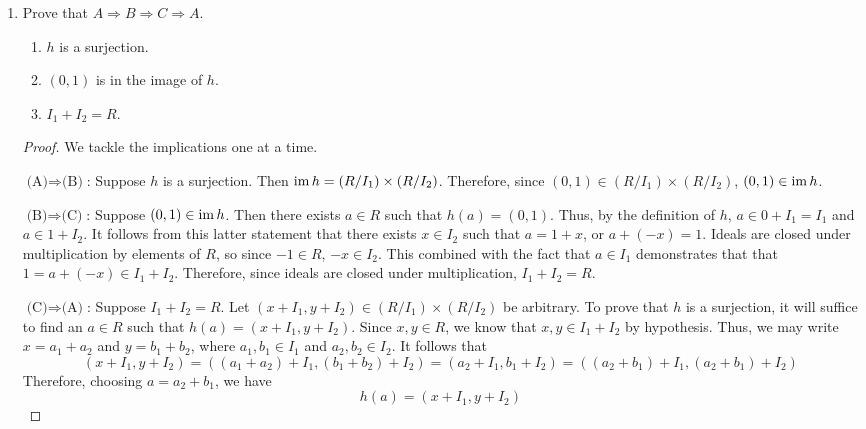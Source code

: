 \documentclass[../psets.tex]{subfiles}
\begin{document}
\begin{enumerate}
\begin{enumerate}[label={(\roman*)}]
\begin{proof}
            \begin{equation*}
                \boxed{\ker(h) = I_1\cap I_2}
            \end{equation*}
        \end{proof}
        \item Prove that $A\Longrightarrow B\Longrightarrow C\Longrightarrow A$.
        \begin{enumerate}[label={(\Alph*)}]
            \item $h$ is a surjection.
            \item $(0,1)$ is in the image of $h$.
            \item $I_1+I_2=R$.
        \end{enumerate}
        \begin{proof}
            We tackle the implications one at a time.\par\smallskip
            \underline{$\text{(A)}\Longrightarrow\text{(B)}$}: Suppose $h$ is a surjection. Then $\operatorname{im} h=(R/I_1)\times(R/I_2)$. Therefore, since $(0,1)\in(R/I_1)\times(R/I_2)$, $(0,1)\in\operatorname{im} h$.\par
            \underline{$\text{(B)}\Longrightarrow\text{(C)}$}: Suppose $(0,1)\in\operatorname{im} h$. Then there exists $a\in R$ such that $h(a)=(0,1)$. Thus, by the definition of $h$, $a\in 0+I_1=I_1$ and $a\in 1+I_2$. It follows from this latter statement that there exists $x\in I_2$ such that $a=1+x$, or $a+(-x)=1$. Ideals are closed under multiplication by elements of $R$, so since $-1\in R$, $-x\in I_2$. This combined with the fact that $a\in I_1$ demonstrates that that $1=a+(-x)\in I_1+I_2$. Therefore, since ideals are closed under multiplication, $I_1+I_2=R$.\par
            \underline{$\text{(C)}\Longrightarrow\text{(A)}$}: Suppose $I_1+I_2=R$. Let $(x+I_1,y+I_2)\in(R/I_1)\times(R/I_2)$ be arbitrary. To prove that $h$ is a surjection, it will suffice to find an $a\in R$ such that $h(a)=(x+I_1,y+I_2)$. Since $x,y\in R$, we know that $x,y\in I_1+I_2$ by hypothesis. Thus, we may write $x=a_1+a_2$ and $y=b_1+b_2$, where $a_1,b_1\in I_1$ and $a_2,b_2\in I_2$. It follows that
            \begin{equation*}
                (x+I_1,y+I_2) = ((a_1+a_2)+I_1,(b_1+b_2)+I_2)
                = (a_2+I_1,b_1+I_2)
                = ((a_2+b_1)+I_1,(a_2+b_1)+I_2)
            \end{equation*}
            Therefore, choosing $a=a_2+b_1$, we have
            \begin{equation*}
                h(a) = (x+I_1,y+I_2)

\end{equation*}
\end{proof}
\end{enumerate}
\end{enumerate}
\end{document}
